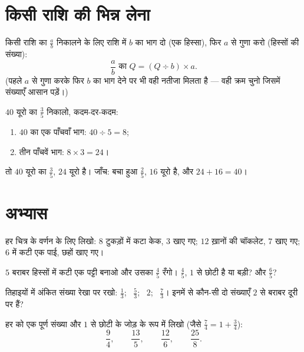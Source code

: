 \section{किसी राशि की भिन्न लेना}

\begin{method}[राशि की भिन्न]\label{met:g6:fractions:ofquantity}
किसी राशि का $\frac ab$ निकालने के लिए राशि में $b$ का भाग दो
(एक हिस्सा), फिर $a$ से गुणा करो (हिस्सों की संख्या):
\[
\frac ab \text{ का } Q = (Q \div b) \times a .
\]
(पहले $a$ से गुणा करके फिर $b$ का भाग देने पर भी वही नतीजा मिलता
है --- वही क्रम चुनो जिसमें संख्याएँ आसान पड़ें।)
\end{method}

\begin{example}\label{ex:g6:fractions:ofquantity}
$40$ यूरो का $\frac35$ निकालो, कदम-दर-कदम:
\begin{enumerate}
  \item $40$ का एक पाँचवाँ भाग: $40 \div 5 = 8$;
  \item तीन पाँचवें भाग: $8 \times 3 = 24$।
\end{enumerate}
तो $40$ यूरो का $\frac35$, $24$ यूरो है। जाँच: बचा हुआ
$\frac25$, $16$ यूरो है, और $24 + 16 = 40$।
\end{example}

\section{अभ्यास}

\begin{exercise}[$\star$]\label{exo:g6:fractions:1}
हर चित्र के वर्णन के लिए  लिखो: $8$ टुकड़ों में कटा केक,
$3$ खाए गए; $12$ ख़ानों की चॉकलेट, $7$ खाए गए; $6$ में कटी एक
पाई, छहों खाए गए।
\end{exercise}

\begin{exercise}[$\star$]\label{exo:g6:fractions:2}
$5$ बराबर हिस्सों में कटी एक पट्टी बनाओ और उसका $\frac45$ रँगो।
$\frac45$, $1$ से छोटी है या बड़ी? और $\frac65$?
\end{exercise}

\begin{exercise}[$\star$]\label{exo:g6:fractions:3}
तिहाइयों में अंकित संख्या रेखा पर रखो: $\frac13$; \ $\frac53$;
\ $2$; \ $\frac73$। इनमें से कौन-सी दो संख्याएँ $2$ से बराबर
दूरी पर हैं?
\end{exercise}

\begin{exercise}[$\star$]\label{exo:g6:fractions:4}
हर  को एक पूर्ण संख्या और $1$ से छोटी  के जोड़ के रूप
में लिखो (जैसे $\frac74 = 1 + \frac34$):
\[
\frac{9}{4}, \qquad \frac{13}{5}, \qquad \frac{12}{6}, \qquad
\frac{25}{8} .
\]
\end{exercise}

